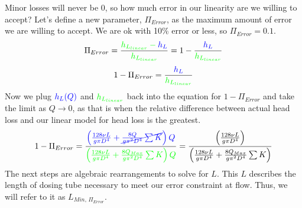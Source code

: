 \documentclass[letterpaper,10pt,english]{sphinxmanual}
\begin{document}
Minor losses will never be 0, so how much error in our linearity are we willing to accept? Let’s define a new parameter, \(\Pi_{Error}\), as the maximum amount of error we are willing to accept. We are ok with 10\% error or less, so \(\Pi_{Error} = 0.1\).
\begin{equation}\label{equation:Flow_Control_and_Measurement/FCM_Derivations:Flow_Control_and_Measurement/FCM_Derivations:25}
\begin{split}\Pi_{Error} = \frac{\color{green}{ h_{L_{linear}} } - \color{blue}{ h_L }}{\color{green}{ h_{L_{linear}} }} = 1 - \frac{\color{blue}{ h_L }}{\color{green}{ h_{L_{linear}} }}\end{split}
\end{equation}\begin{equation}\label{equation:Flow_Control_and_Measurement/FCM_Derivations:Flow_Control_and_Measurement/FCM_Derivations:26}
\begin{split}1 - \Pi_{Error} = \frac{\color{blue}{ h_L }}{\color{green}{ h_{L_{linear}} }}\end{split}
\end{equation}
Now we plug \(\color{blue}{ h_L(Q) }\) and \(\color{green}{ h_{L_{linear}} }\) back into the equation for \(1 - \Pi_{Error}\) and take the limit as \(Q \rightarrow 0\), as that is when the relative difference between actual head loss and our linear model for head loss is the greatest.
\begin{equation}\label{equation:Flow_Control_and_Measurement/FCM_Derivations:Flow_Control_and_Measurement/FCM_Derivations:27}
\begin{split}1 - \Pi_{Error} =
  \frac{ \color{blue}{
  \left( \frac{128 \nu L}{g \pi D^4} +
  \cancel{\frac{8Q}{g \pi^2 D^4} \sum{K}}
  \right) Q
  }}
  {\color{green}{
  \left( \frac{128 \nu L}{g \pi D^4} + \frac{8 Q_{Max}}{g \pi^2 D^4} \sum{K} \right) Q
  }}
  =     \frac{\left( \frac{128 \nu L}{g \pi D^4} \right)}{\left( \frac{128 \nu L}{g \pi D^4} + \frac{8 Q_{Max}}{g \pi^2 D^4} \sum{K} \right)}\end{split}
\end{equation}
The next steps are algebraic rearrangements to solve for \(L\). This \(L\) describes the  length of dosing tube necessary to meet our error constraint at  flow. Thus, we will refer to it as \(L_{Min, \, \Pi_{Error}}\).
\end{document}
